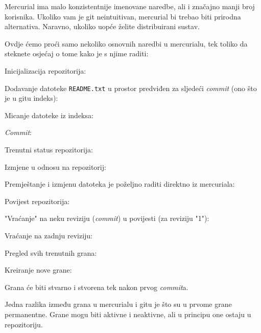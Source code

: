 Mercurial ima malo konzistentnije imenovane naredbe, ali i značajno manji broj korisnika.
Ukoliko vam je git neintuitivan, mercurial bi trebao biti prirodna alternativa. 
Naravno, ukoliko uopće želite distribuirani sustav.

Ovdje ćemo proći samo nekoliko osnovnih naredbi u mercurialu, tek toliko da steknete osjećaj o tome kako je s njime raditi:

Inicijalizacija repozitorija:


Dodavanje datoteke \verb+README.txt+ u prostor predviđen za sljedeći \emph{commit} (ono što je u gitu indeks):


Micanje datoteke iz indeksa:


\emph{Commit}:


Trenutni status repozitorija:


Izmjene u odnosu na repozitorij:


Premještanje i izmjenu datoteka je poželjno raditi direktno iz mercuriala:


Povijest repozitorija:


"Vraćanje" na neku reviziju (\emph{commit}) u povijesti (za reviziju "1"):


Vraćanje na zadnju reviziju:


Pregled svih trenutnih grana:


Kreiranje nove grane:


Grana će biti stvarno i stvorena tek nakon prvog \emph{commit}a.

Jedna razlika između grana u mercurialu i gitu je što su u prvome grane permanentne.
Grane mogu biti aktivne i neaktivne, ali u principu one ostaju u repozitoriju.

